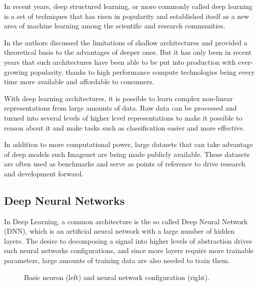 In recent years, deep structured learning, or more commonly called deep learning is a set of techniques that has risen in popularity and established itself as a new area of machine learning among the scientific and research communities. \cite{deng2014deep}

In \cite{bengio2009learning} the authors discussed the limitations of shallow architectures and provided a theoretical basis to the advantages of deeper ones. But it has only been in recent years that such architectures have been able to be put into production with ever-growing popularity, thanks to high performance compute technologies being every time more available and affordable to consumers.

With deep learning architectures, it is possible to learn complex non-linear representations from large amounts of data. Raw data can be processed and turned into several levels of higher level representations to make it possible to reason about it and make tasks such as classification easier and more effective.

In addition to more computational power, large datasets that can take advantage of deep models such Imagenet \cite{russakovsky2015imagenet} are being made publicly available. These datasets are often used as benchmarks and serve as points of reference to drive research and development forward.


\subsection{Deep Neural Networks}

In Deep Learning, a common architecture is the so called Deep Neural Network (DNN), which is an artificial neural network with a large number of hidden layers. The desire to decomposing a signal into higher levels of abstraction drives such neural networks configurations, and since more layers require more trainable parameters, large amounts of training data are also needed to train them.

\begin{figure}[h]
    \centering
    \scalebox{.75} {  }
    \scalebox{.5} {  }
    \caption{Basic neuron (left) and neural network configuration (right).}
    \label{fig:neural-net}
\end{figure}

